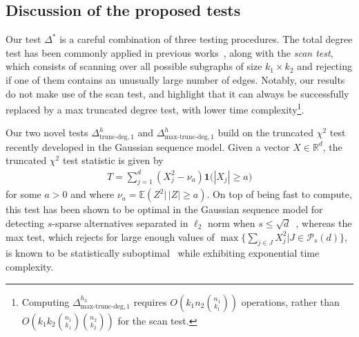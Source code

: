 \documentclass{article}
\newcommand{\R}{\mathbb{R}}
\newcommand{\one}{\mathbf{1}}
\newcommand{\chisqlin}{\text{trunc-deg}}
\newcommand{\chisqmax}{\text{max-trunc-deg}}
\begin{document}
\subsection{Discussion of the proposed tests}
Our test $\Delta^*$ is a careful combination of three testing procedures. 
The total degree test has been commonly applied in previous works~\cite{arias2014community,rotenberg2024planted}, along with the \textit{scan test}, which consists of scanning over all possible subgraphs of size $k_1 \times k_2$ and rejecting if one of them contains an unusually large number of edges. 
Notably, our results do not make use of the scan test, and highlight that it can always be successfully replaced by a max truncated degree test, with lower time complexity\footnote{ Computing $\Delta^{h_3}_{\chisqmax, 1}$ requires $O(k_1n_2{n_1 \choose k_1})$ operations, rather than $O(k_1k_2{n_1 \choose k_1}{n_2 \choose k_2})$ for the scan test. }. 

Our two novel tests $\Delta_{\chisqlin, 1}^h$ and $\Delta^{h}_{\chisqmax, 1}$ build on the truncated $\chi^2$ test recently developed in the Gaussian sequence model. 
Given a vector $X \in \R^d$, the truncated $\chi^2$ test statistic is given by
\begin{align*}
    T = \sum_{j=1}^d (X_j^2 - \nu_a) \one{\big(|X_j| \geq a\big)}
\end{align*}
for some $a>0$ and where $\nu_a = \mathbb E\left(Z^2 \big|\,|Z| \geq a\right)$. 
On top of being fast to compute, this test has been shown to be optimal in the Gaussian sequence model for detecting $s$-sparse alternatives separated in $\ell_2$ norm when $s \leq \sqrt{d}$~\cite{collier2017minimax}, whereas the max test, which rejects for large enough values of $\max \big\{\sum_{j \in J} X_j^2 | J \in \mathcal{P}_{s}(d)\big\}$, is known to be statistically suboptimal~\cite{baraud2002non} while exhibiting exponential time complexity. 
\end{document}
